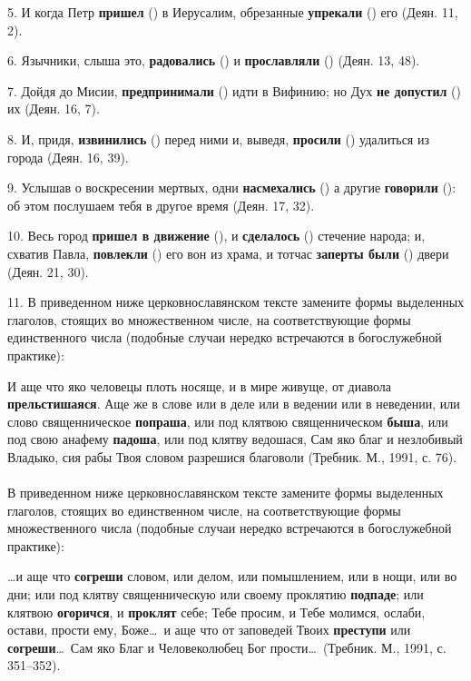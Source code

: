 \documentclass[11pt,a4paper,oneside]{memoir}
\newcommand{\exercise}{}
\begin{document}
    5. И когда Петр \textbf{пришел} ({}) в Иерусалим, обрезанные \textbf{упрекали} ({}) его (Деян. 11, 2).
    
    6. Язычники, слыша это, \textbf{радовались} ({}) и \textbf{прославляли} ({}) (Деян. 13, 48).
    
    7. Дойдя до Мисии, \textbf{предпринимали} ({}) идти в Вифинию; но Дух \textbf{не допустил} ({}) их (Деян. 16, 7).
    
    8. И, придя, \textbf{извинились} ({}) перед ними и, выведя, \textbf{просили} ({}) удалиться из города (Деян. 16, 39).
    
    9. Услышав о воскресении мертвых, одни \textbf{насмехались} ({}) а другие \textbf{говорили} ({}): об этом послушаем тебя в другое время (Деян. 17, 32).
    
    10. Весь город \textbf{пришел в движение} ({}), и \textbf{сделалось} ({}) стечение народа; и, схватив Павла, \textbf{повлекли} ({}) его вон из храма, и тотчас \textbf{заперты были} ({}) двери (Деян. 21, 30).
    
    11. В приведенном ниже церковнославянском тексте замените формы выделенных глаголов, стоящих во множественном числе, на соответствующие формы единственного числа (подобные случаи нередко встречаются в богослужебной практике):
    
    И аще что яко человецы плоть носяще, и в мире живуще, от диавола \textbf{прельстишаяся}. Аще же в слове или в деле или в ведении или в неведении, или слово священническое \textbf{попраша}, или под клятвою священническом \textbf{быша}, или под свою анафему \textbf{падоша}, или под клятву ведошася, Сам яко благ и незлобивый Владыко, сия рабы Твоя словом разрешися благоволи (Требник. М., 1991, с. 76).

                    \paragraph{\exercise}
                    
    В приведенном ниже церковнославянском тексте замените формы выделенных глаголов, стоящих во единственном числе, на соответствующие формы множественного числа (подобные случаи нередко встречаются в богослужебной практике):
    
    \ldots и аще что \textbf{согреши} словом, или делом, или помышлением, или в нощи, или во дни; или под клятву священническую или своему проклятию \textbf{подпаде}; или клятвою \textbf{огоричся}, и \textbf{проклят} себе; Тебе просим, и Тебе молимся, ослаби, остави, прости ему, Боже\ldots~и аще что от заповедей Твоих \textbf{преступи} или \textbf{согреши}\ldots~Сам яко Благ и Человеколюбец Бог прости\ldots~(Требник. М., 1991, с. 351--352).
\end{document}

